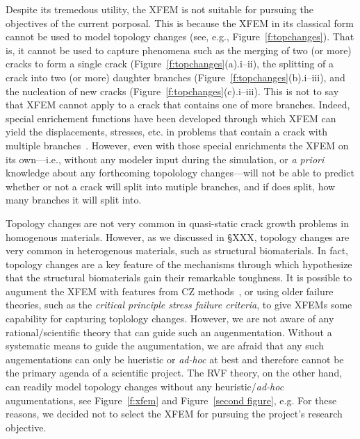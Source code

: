 \documentclass[10pt,letterpaper]{article}
\begin{document}
    Despite its tremedous utility,  the XFEM is not suitable for pursuing the objectives of the current porposal. This is  because  the XFEM in its classical form cannot  be used to  model topology changes (see, e.g., Figure~\ref{f:topchanges}). That is, it cannot  be used to capture phenomena such as  the merging of two (or more)  cracks to  form a single crack (Figure~\ref{f:topchanges}(a).i--ii), the splitting of a crack into two (or more)  daughter branches (Figure~\ref{f:topchanges}(b).i--iii), and  the nucleation of new cracks (Figure~\ref{f:topchanges}(c).i--iii).  This is not to say that XFEM cannot  apply to a crack that contains one of more branches. Indeed, special  enrichement functions have been developed through which  XFEM  can yield  the  displacements, stresses, etc.  in  problems that contain a crack with  multiple branches~\cite{daux2000arbitrary,belytschko2001arbitrary}. However, even  with those special enrichments  the XFEM  on its own---i.e., without any modeler input during the simulation, or \textit{a priori} knowledge about any  forthcoming topolology changes---will not be able to predict whether or not a  crack will split into mutiple branches, and if does split, how many branches it will split into.

    Topology changes are not very common in quasi-static crack growth problems in homogenous materials. However, as we discussed in \S XXX,  topology changes are very common in heterogenous materials, such  as structural biomaterials. In fact,  topology changes are a key feature of the  mechanisms  through which  hypothesize that the structural biomaterials  gain their remarkable   toughness. It is possible to augument the XFEM with features from CZ methods~\cite{wells2001new,moes2002extended,mariani2003extended}, or using older failure theories, such as the  \textit{critical principle stress failure criteria}, to give XFEMs some capability  for capturing toplology changes. However, we are not aware of any rational/scientific  theory that can guide such an augenmentation. Without a systematic means  to  guide the augumentation, we are afraid  that any such augementations can only be  hueristic or \textit{ad-hoc}  at best and therefore cannot be the primary agenda of a scientific project. The  RVF theory, on the other hand, can readily model topology  changes without any heuristic/\textit{ad-hoc} augumentations, see  Figure~\ref{f:xfem} and Figure~\ref{second figure}, e.g.   For these reasons, we decided not to select the XFEM for  pursuing  the  project's research objective.
\end{document}
